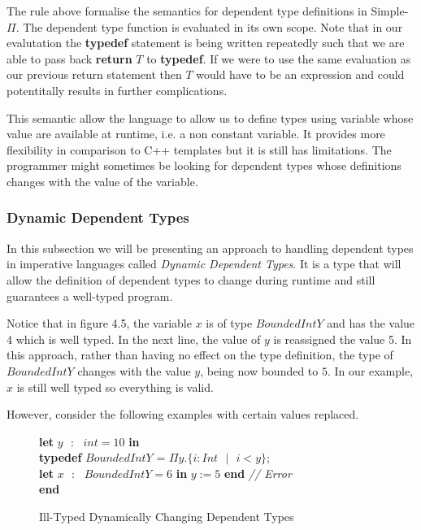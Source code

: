 \documentclass[a4paper,12pt]{report}
\newenvironment{tabs}[1]
 {\flushleft\TabPositions{#1}}
 {\endflushleft}
\begin{document}
\par 
The rule above formalise the semantics for dependent type definitions in 
Simple-$\Pi$. The dependent type function is evaluated in its own scope. Note 
that in our evalutation the \textbf{typedef} statement is being written 
repeatedly such that we are able to pass back \textbf{return} $T$ to 
\textbf{typedef}. If we were to use the same evaluation as our previous return 
statement then $T$ would have to be an expression and could potentitally results 
in further complications. 

\par
This semantic allow the language to allow us to define types using variable 
whose value are available at runtime, i.e. a non constant variable. It provides 
more flexibility in comparison to C++ templates but it is still has limitations. The 
programmer might sometimes be looking for dependent types whose definitions 
changes with the value of the variable. 

\subsubsection{Dynamic Dependent Types}
In this subsection we will be presenting an approach to handling dependent types 
in imperative languages called \textit{Dynamic Dependent Types}. It is a type 
that will allow the definition of dependent types to change during runtime and 
still guarantees a well-typed program. 

\par
Notice that in figure 4.5, the variable $x$ is 
of type $BoundedIntY$ and has the value 4 which is well typed. In the next line, 
the value of $y$ is reassigned the value 5. In this approach, rather than having 
no effect on the type definition, the type of $BoundedIntY$ changes with the 
value $y$, being now bounded to $5$. In our example, $x$ is still well typed so 
everything is valid. 


\par
However, consider the following examples with certain values replaced. 

\begin{figure} [H]
  \begin{tabs}{1cm,2cm}
    \textbf{let }$y\text{ }:\text{ } int = 10$ \textbf{ in } \\
    \tab\textbf{typedef }$BoundedIntY$ = $\Pi y. \{i : Int\text{ }|\text{ }i < y\}$; \\ 
    \tab\textbf{let }$x\text{ }:\text{ }BoundedIntY = 6$ \textbf{ in }$y := 5$\textbf { end }\textit{// Error}\\
    \textbf {end}
  \end{tabs}  
  \caption{Ill-Typed Dynamically Changing Dependent Types}
\end{figure}
\end{document}
